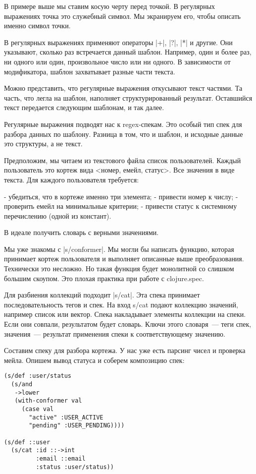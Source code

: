 В примере выше мы ставим косую черту перед точкой. В регулярных выражениях точка
это служебный символ. Мы экранируем его, чтобы описать именно символ точки.

В регулярных выражениях применяют операторы \spverb|+|, \spverb|?|, \spverb|*| и другие. Они
указывают, сколько раз встречается данный шаблон. Например, один и более раз, ни
одного или один, произвольное число или ни одного. В зависимости от
модификатора, шаблон захватывает разные части текста.

Можно представить, что регулярные выражения откусывают текст частями. Та часть,
что легла на шаблон, наполняет структурированный результат. Оставшийся текст
передается следующим шаблонам, и так далее.

Регулярные выражения подводят нас к regex-спекам. Это особый тип спек для
разбора данных по шаблону. Разница в том, что и шаблон, и исходные данные это
структуры, а не текст.

Предположим, мы читаем из текстового файла список пользователей. Каждый
пользователь это кортеж вида <номер, емейл, статус>. Все значения в виде
текста. Для каждого пользователя требуется:

- убедиться, что в кортеже именно три элемента;
- привести номер к числу;
- проверить емейл на минимальные критерии;
- привести статус к системному перечислению (одной из констант).

В идеале получить словарь с верными значениями.

Мы уже знакомы с \spverb|s/conformer|. Мы могли бы написать функцию, которая принимает
кортеж пользователя и выполняет описанные выше преобразования. Технически это
несложно. Но такая функция будет монолитной со слишком большим скоупом. Это
плохая практика при работе с clojure.spec.

Для разбиения коллекций подходит \spverb|s/cat|. Эта спека принимает последовательность
тегов и спек. На вход s/cat подают коллекцию значений, например список или
вектор. Спека накладывает элементы коллекции на спеки. Если они совпали,
результатом будет словарь. Ключи этого словаря~--- теги спек, значения~--- результат
применения спеки к соответствующему значению.

Составим спеку для разбора кортежа. У нас уже есть парсинг чисел и проверка
мейла. Опишем вывод статуса и соберем композицию спек:

\begin{verbatim}
(s/def :user/status
  (s/and
   ->lower
   (with-conformer val
     (case val
       "active" :USER_ACTIVE
       "pending" :USER_PENDING))))

(s/def ::user
  (s/cat :id ::->int
         :email ::email
         :status :user/status))
\end{verbatim}

